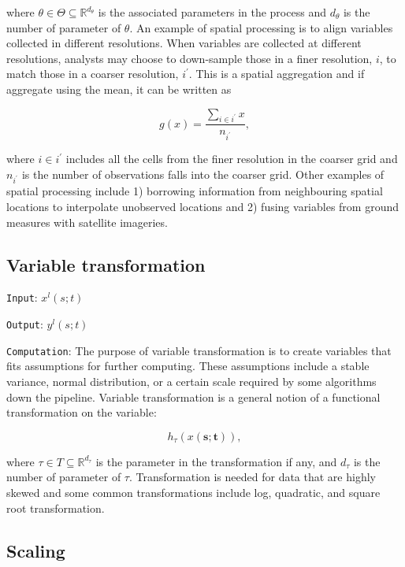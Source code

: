\documentclass[
]{interact}
\begin{document}
where \(\theta \in \Theta \subseteq \mathbb{R}^{d_{\theta}}\) is the
associated parameters in the process and \(d_{\theta}\) is the number of
parameter of \(\theta\). An example of spatial processing is to align
variables collected in different resolutions. When variables are
collected at different resolutions, analysts may choose to down-sample
those in a finer resolution, \(i\), to match those in a coarser
resolution, \(i^\prime\). This is a spatial aggregation and if aggregate
using the mean, it can be written as

\begin{equation}
g(x) = \frac{\sum_{i \in i^\prime}x}{n_{i^\prime}},
\end{equation}

where \(i \in i^\prime\) includes all the cells from the finer
resolution in the coarser grid and \(n_{i^\prime}\) is the number of
observations falls into the coarser grid. Other examples of spatial
processing include 1) borrowing information from neighbouring spatial
locations to interpolate unobserved locations and 2) fusing variables
from ground measures with satellite imageries.

\hypertarget{variable-transformation}{%
\subsection{Variable transformation}\label{variable-transformation}}

\texttt{Input}: \(x^l(s; t)\)

\texttt{Output}: \(y^l(s; t)\)

\texttt{Computation}: The purpose of variable transformation is to
create variables that fits assumptions for further computing. These
assumptions include a stable variance, normal distribution, or a certain
scale required by some algorithms down the pipeline. Variable
transformation is a general notion of a functional transformation on the
variable:

\begin{equation}
h_{\tau}(x(\mathbf{s};\mathbf{t})),
\end{equation}

where \(\tau \in T \subseteq \mathbb{R}^{d_{\tau}}\) is the parameter in
the transformation if any, and \(d_{\tau}\) is the number of parameter
of \(\tau\). Transformation is needed for data that are highly skewed
and some common transformations include log, quadratic, and square root
transformation.

\hypertarget{scaling}{%
\subsection{Scaling}\label{scaling}}
\end{document}
